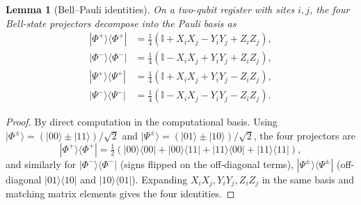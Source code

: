 \documentclass[pdflatex,sn-mathphys-num]{sn-jnl}
\theoremstyle{thmstyleone}
\newtheorem{lemma}{Lemma}
\theoremstyle{thmstyletwo}
\theoremstyle{thmstylethree}
\begin{document}
\begin{lemma}[Bell--Pauli identities]\label{lem:bell-pauli}
On a two-qubit register with sites $i,j$, the four Bell-state
projectors decompose into the Pauli basis as
\begin{align*}
|\Phi^+\rangle\!\langle\Phi^+| &= \tfrac14(\mathbb{I} + X_iX_j - Y_iY_j + Z_iZ_j),\\
|\Phi^-\rangle\!\langle\Phi^-| &= \tfrac14(\mathbb{I} - X_iX_j + Y_iY_j + Z_iZ_j),\\
|\Psi^+\rangle\!\langle\Psi^+| &= \tfrac14(\mathbb{I} + X_iX_j + Y_iY_j - Z_iZ_j),\\
|\Psi^-\rangle\!\langle\Psi^-| &= \tfrac14(\mathbb{I} - X_iX_j - Y_iY_j - Z_iZ_j).
\end{align*}
\end{lemma}
\begin{proof}
By direct computation in the computational basis. Using
$|\Phi^\pm\rangle=(|00\rangle\pm|11\rangle)/\sqrt2$ and
$|\Psi^\pm\rangle=(|01\rangle\pm|10\rangle)/\sqrt2$, the four
projectors are
\[
|\Phi^+\rangle\!\langle\Phi^+| =
\tfrac12\!\left(|00\rangle\!\langle 00|+|00\rangle\!\langle 11|+|11\rangle\!\langle 00|+|11\rangle\!\langle 11|\right),
\]
and similarly for $|\Phi^-\rangle\!\langle\Phi^-|$ (signs flipped on
the off-diagonal terms),
$|\Psi^\pm\rangle\!\langle\Psi^\pm|$ (off-diagonal $|01\rangle\!\langle 10|$ and $|10\rangle\!\langle 01|$).
Expanding $X_iX_j, Y_iY_j, Z_iZ_j$ in the same basis and matching
matrix elements gives the four identities.
\end{proof}
\end{document}

